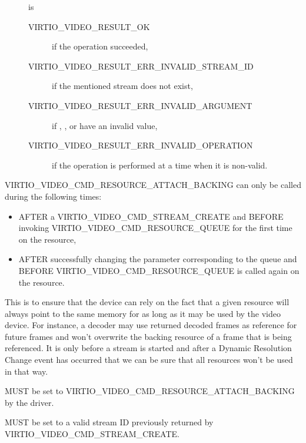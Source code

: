 \begin{description}
\item[]
is

\begin{description}
\item[VIRTIO\_VIDEO\_RESULT\_OK]
if the operation succeeded,
\item[VIRTIO\_VIDEO\_RESULT\_ERR\_INVALID\_STREAM\_ID]
if the mentioned stream does not exist,
\item[VIRTIO\_VIDEO\_RESULT\_ERR\_INVALID\_ARGUMENT]
if , , or  have an
invalid value,
\item[VIRTIO\_VIDEO\_RESULT\_ERR\_INVALID\_OPERATION]
if the operation is performed at a time when it is non-valid.
\end{description}
\end{description}

VIRTIO\_VIDEO\_CMD\_RESOURCE\_ATTACH\_BACKING can only be called during
the following times:

\begin{itemize}
\item
  AFTER a VIRTIO\_VIDEO\_CMD\_STREAM\_CREATE and BEFORE invoking
  VIRTIO\_VIDEO\_CMD\_RESOURCE\_QUEUE for the first time on the
  resource,
\item
  AFTER successfully changing the 
  parameter corresponding to the queue and BEFORE
  VIRTIO\_VIDEO\_CMD\_RESOURCE\_QUEUE is called again on the resource.
\end{itemize}

This is to ensure that the device can rely on the fact that a given
resource will always point to the same memory for as long as it may be
used by the video device. For instance, a decoder may use returned
decoded frames as reference for future frames and won't overwrite the
backing resource of a frame that is being referenced. It is only before
a stream is started and after a Dynamic Resolution Change event has
occurred that we can be sure that all resources won't be used in that
way.


 MUST be set to
VIRTIO\_VIDEO\_CMD\_RESOURCE\_ATTACH\_BACKING by the driver.

 MUST be set to a valid stream ID previously returned
by VIRTIO\_VIDEO\_CMD\_STREAM\_CREATE.

